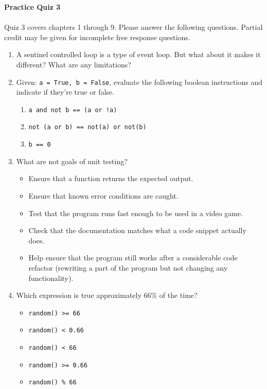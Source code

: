 \documentclass[letter,10pt]{article}
\begin{document}
\huge
\textbf{Practice Quiz 3}
\normalsize

\paragraph{}Quiz 3 covers chapters 1 through 9. Please answer the following questions. Partial credit may be given for incomplete free response questions.

\begin{enumerate}
    \item A sentinel controlled loop is a type of event loop. But what about it makes it different? What are any limitations?

    \item Given: \verb|a = True, b = False|, evaluate the following boolean instructions and indicate if they're true or false.
    \begin{enumerate}
        \item \verb|a and not b == (a or !a)|
        \item \verb|not (a or b) == not(a) or not(b)|
        \item \verb|b == 0|
    \end{enumerate}

    \item What are not goals of unit testing?
    \begin{itemize}
        \item Ensure that a function returns the expected output.
        \item Ensure that known error conditions are caught.
        \item Test that the program runs fast enough to be used in a video game.
        \item Check that the documentation matches what a code snippet actually does.
        \item Help ensure that the program still works after a considerable code refactor (rewriting a part of the program but not changing any functionality).
    \end{itemize}

    \item Which expression is true approximately 66\% of the time?
    \begin{itemize}
        \item \verb|random() >= 66|
        \item \verb|random() < 0.66|
        \item \verb|random() < 66|
        \item \verb|random() >= 0.66|
        \item \verb|random() % 66|
    \end{itemize}


\end{enumerate}
\end{document}
